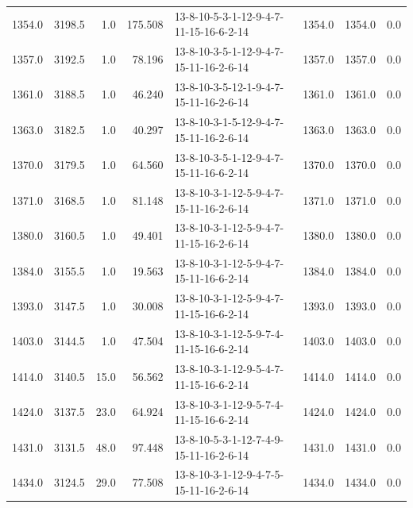 \begin{tabular}{rrrrlrrr}
 1354.0 &  3198.5 &            1.0 &            175.508 &  13-8-10-5-3-1-12-9-4-7-11-15-16-6-2-14 &        1354.0 &          1354.0 &       0.0 \\
 1357.0 &  3192.5 &            1.0 &             78.196 &  13-8-10-3-5-1-12-9-4-7-15-11-16-2-6-14 &        1357.0 &          1357.0 &       0.0 \\
 1361.0 &  3188.5 &            1.0 &             46.240 &  13-8-10-3-5-12-1-9-4-7-15-11-16-2-6-14 &        1361.0 &          1361.0 &       0.0 \\
 1363.0 &  3182.5 &            1.0 &             40.297 &  13-8-10-3-1-5-12-9-4-7-15-11-16-2-6-14 &        1363.0 &          1363.0 &       0.0 \\
 1370.0 &  3179.5 &            1.0 &             64.560 &  13-8-10-3-5-1-12-9-4-7-15-11-16-6-2-14 &        1370.0 &          1370.0 &       0.0 \\
 1371.0 &  3168.5 &            1.0 &             81.148 &  13-8-10-3-1-12-5-9-4-7-15-11-16-2-6-14 &        1371.0 &          1371.0 &       0.0 \\
 1380.0 &  3160.5 &            1.0 &             49.401 &  13-8-10-3-1-12-5-9-4-7-11-15-16-2-6-14 &        1380.0 &          1380.0 &       0.0 \\
 1384.0 &  3155.5 &            1.0 &             19.563 &  13-8-10-3-1-12-5-9-4-7-15-11-16-6-2-14 &        1384.0 &          1384.0 &       0.0 \\
 1393.0 &  3147.5 &            1.0 &             30.008 &  13-8-10-3-1-12-5-9-4-7-11-15-16-6-2-14 &        1393.0 &          1393.0 &       0.0 \\
 1403.0 &  3144.5 &            1.0 &             47.504 &  13-8-10-3-1-12-5-9-7-4-11-15-16-6-2-14 &        1403.0 &          1403.0 &       0.0 \\
 1414.0 &  3140.5 &           15.0 &             56.562 &  13-8-10-3-1-12-9-5-4-7-11-15-16-6-2-14 &        1414.0 &          1414.0 &       0.0 \\
 1424.0 &  3137.5 &           23.0 &             64.924 &  13-8-10-3-1-12-9-5-7-4-11-15-16-6-2-14 &        1424.0 &          1424.0 &       0.0 \\
 1431.0 &  3131.5 &           48.0 &             97.448 &  13-8-10-5-3-1-12-7-4-9-15-11-16-2-6-14 &        1431.0 &          1431.0 &       0.0 \\
 1434.0 &  3124.5 &           29.0 &             77.508 &  13-8-10-3-1-12-9-4-7-5-15-11-16-2-6-14 &        1434.0 &          1434.0 &       0.0 \\

\end{tabular}
